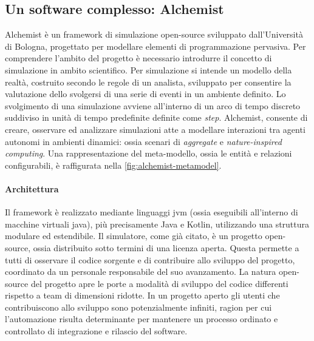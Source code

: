 \subsection{Un software complesso: Alchemist}\label{sec:alchemist}
Alchemist\cite{Pianini_2013} è un framework di simulazione open-source sviluppato dall'Università di Bologna, progettato per modellare elementi di programmazione pervasiva. Per comprendere l'ambito del progetto è necessario introdurre il concetto di simulazione in ambito scientifico. Per simulazione si intende un modello della realtà, costruito secondo le regole di un analista, sviluppato per consentire la valutazione dello svolgersi di una serie di eventi in un ambiente definito. Lo svolgimento di una simulazione avviene all'interno di un arco di tempo discreto suddiviso in unità di tempo predefinite definite come \textit{step}. Alchemist, consente di creare, osservare ed analizzare simulazioni atte a modellare interazioni tra agenti autonomi in ambienti dinamici: ossia scenari di \textit{aggregate} e \textit{nature-inspired computing}. Una rappresentazione del meta-modello, ossia le entità e relazioni configurabili, è raffigurata nella \cref{fig:alchemist-metamodel}.



\paragraph{Architettura}
Il framework è realizzato mediante linguaggi \ac{jvm} (ossia eseguibili all'interno di macchine virtuali java), più precisamente Java e Kotlin, utilizzando una struttura modulare ed estendibile. Il simulatore, come già citato, è un progetto open-source, ossia distribuito sotto termini di una licenza aperta. Questa permette a tutti di osservare il codice sorgente e di contribuire allo sviluppo del progetto, coordinato da un personale responsabile del suo avanzamento. La natura open-source del progetto apre le porte a modalità di sviluppo del codice differenti rispetto a team di dimensioni ridotte. In un progetto aperto gli utenti che contribuiscono allo sviluppo sono potenzialmente infiniti, ragion per cui l'automazione risulta determinante per mantenere un processo ordinato e controllato di integrazione e rilascio del software.

